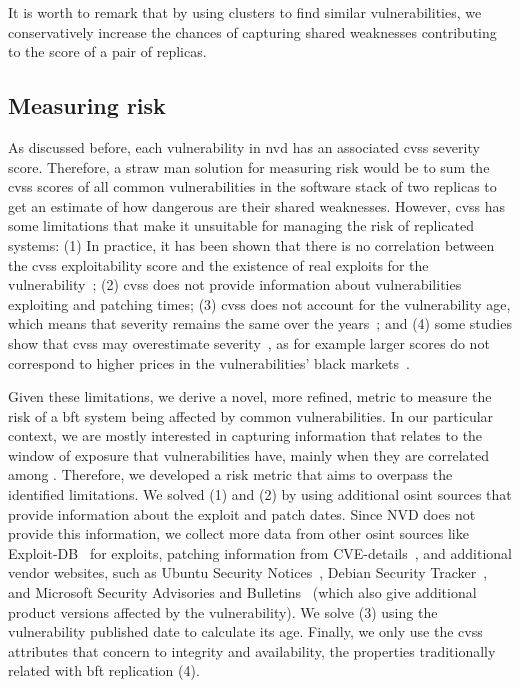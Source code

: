 It is worth to remark that by using clusters to find similar vulnerabilities, we conservatively increase the chances of capturing shared weaknesses contributing to the score of a pair of replicas.

\subsection*{Measuring risk}
\label{sec:measurerisk}

As discussed before, each vulnerability in \gls{nvd} has an associated \gls{cvss} severity score. 
Therefore, a straw man solution for measuring risk would be to sum the \gls{cvss} scores of all common vulnerabilities in the software stack of two replicas to get an estimate of how dangerous are their shared weaknesses.
However, \gls{cvss} has some limitations that make it unsuitable for managing the risk of replicated systems:
(1) In practice, it has been shown that there is no correlation between the \gls{cvss} exploitability score and the existence of real exploits for the vulnerability~\cite{Bozorgi:2010}; 
(2) \gls{cvss} does not provide information about vulnerabilities exploiting and patching times; 
(3) \gls{cvss} does not account for the vulnerability age, which means that severity remains the same over the years~\cite{Frei:2006}; 
and (4) some studies show that \gls{cvss} may overestimate  severity~\cite{Sabottke:2015}, as for example larger scores do not correspond to higher prices in the vulnerabilities' black markets~\cite{Allodi:2014}.

Given these limitations, we derive a novel, more refined, metric to measure the risk of a \gls{bft} system being affected by common vulnerabilities.
In our particular context, we are mostly interested in capturing information that relates to the window of exposure that vulnerabilities have, mainly when they are correlated among \replicas.
Therefore, we developed a risk metric that aims to overpass the identified limitations. 
We solved (1) and (2) by using additional \gls{osint} sources that provide information about the exploit and patch dates. 
Since NVD does not provide this information, we collect more data from other \gls{osint} sources like Exploit-DB~\cite{edb} for exploits, patching information from CVE-details~\cite{cvedetails}, and additional vendor websites, such as Ubuntu Security Notices~\cite{ubuntu}, Debian Security Tracker~\cite{debian}, and Microsoft Security Advisories and Bulletins~\cite{microsoft} (which also give additional product versions affected by the vulnerability).
We solve (3) using the vulnerability published date to calculate its age.
Finally, we only use the \gls{cvss} attributes that concern to integrity and availability, the properties traditionally related with \gls{bft} replication (4).



